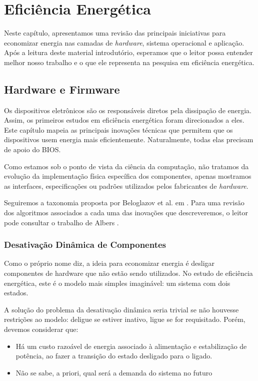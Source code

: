 \chapter{Eficiência Energética}

Neste capítulo, apresentamos uma revisão das principais iniciativas para economizar energia nas camadas de \emph{hardware}, sistema operacional e aplicação. Após a leitura deste material introdutório, esperamos que o leitor possa entender melhor nosso trabalho e o que ele representa na pesquisa em eficiência energética.

\section{Hardware e Firmware}

Os dispositivos eletrônicos são os responsáveis diretos pela dissipação de energia. Assim, os primeiros estudos em eficiência energética foram direcionados a eles. Este capítulo mapeia as principais inovações técnicas que permitem que os dispositivos usem energia mais eficientemente. Naturalmente, todas elas precisam de apoio do BIOS.

Como estamos sob o ponto de vista da ciência da computação, não tratamos da evolução da implementação física específica dos componentes, apenas mostramos as interfaces, especificações ou padrões utilizados pelos fabricantes de \emph{hardware}.

Seguiremos a taxonomia proposta por Beloglazov et al. em \cite{beloglazov2011taxonomy}. Para uma revisão dos algoritmos associados a cada uma das inovações que descreveremos, o leitor pode consultar o trabalho de Albers \cite{albers2010energy}.

\subsection{Desativação Dinâmica de Componentes}

Como o próprio nome diz, a ideia para economizar energia é desligar componentes de hardware que não estão sendo utilizados. No estudo de eficiência energética, este é o modelo mais simples imaginável: um sistema com dois estados.

A solução do problema da desativação dinâmica seria trivial se não houvesse restrições ao modelo: deligue se estiver inativo, ligue se for requisitado. Porém, devemos considerar que:
\begin{itemize}
    \item Há um custo razoável de energia associado à alimentação e estabilização de potência, ao fazer a transição do estado desligado para o ligado.

    \item Não se sabe, a priori, qual será a demanda do sistema no futuro
\end{itemize}

